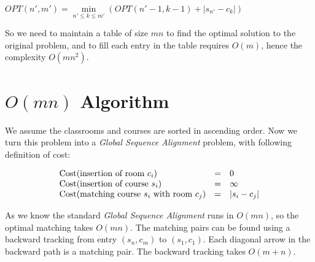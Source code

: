 \begin{center}
  $OPT(n', m') = \min\limits_{n'\leq k \leq m'} (OPT(n'-1, k-1) + |s_{n'} - c_{k}|)$
\end{center}

So we need to maintain a table of size $mn$ to find the optimal solution to the original problem, and to fill each entry in the table requires $O(m)$, hence the  complexity $O(mn^2)$.

\section{$O(mn)$ Algorithm}

We assume the classrooms and courses are sorted in ascending order. Now we turn this problem into a \textit{Global Sequence Alignment} problem, with following definition of cost:

\[
\begin{array}{l l l}
  \text{Cost(insertion of room $c_i$)} & = & 0 \\
  \text{Cost(insertion of course $s_i$)} & = & \infty \\
  \text{Cost(matching course $s_i$ with room $c_j$)} & = & |s_i - c_j|
\end{array}
\]

As we know the standard \textit{Global Sequence Alignment} runs in $O(mn)$, so the optimal matching takes $O(mn)$. The matching pairs can be found using a backward tracking from entry $(s_n, c_m)$ to $(s_1, c_1)$. Each diagonal arrow in the backward path is a matching pair. The backward tracking takes $O(m + n)$.